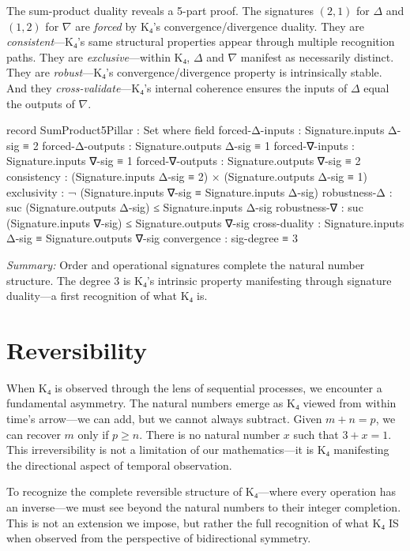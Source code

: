 \documentclass[11pt,a4paper]{book}
\begin{document}
The sum-product duality reveals a 5-part proof. The signatures $(2,1)$ for $\Delta$ and 
$(1,2)$ for $\nabla$ are \emph{forced} by K₄'s convergence/divergence duality. They are 
\emph{consistent}—K₄'s same structural properties appear through multiple recognition paths. 
They are \emph{exclusive}—within K₄, $\Delta$ and $\nabla$ manifest as necessarily distinct. 
They are \emph{robust}—K₄'s convergence/divergence property is intrinsically stable. And 
they \emph{cross-validate}—K₄'s internal coherence ensures the inputs of $\Delta$ equal 
the outputs of $\nabla$.

\begin{code}
record SumProduct5Pillar : Set where
  field
    forced-Δ-inputs  : Signature.inputs Δ-sig ≡ 2
    forced-Δ-outputs : Signature.outputs Δ-sig ≡ 1
    forced-∇-inputs  : Signature.inputs ∇-sig ≡ 1
    forced-∇-outputs : Signature.outputs ∇-sig ≡ 2
    consistency      : (Signature.inputs Δ-sig ≡ 2) × (Signature.outputs Δ-sig ≡ 1)
    exclusivity      : ¬ (Signature.inputs ∇-sig ≡ Signature.inputs Δ-sig)
    robustness-Δ     : suc (Signature.outputs Δ-sig) ≤ Signature.inputs Δ-sig
    robustness-∇     : suc (Signature.inputs ∇-sig) ≤ Signature.outputs ∇-sig
    cross-duality    : Signature.inputs Δ-sig ≡ Signature.outputs ∇-sig
    convergence      : sig-degree ≡ 3
\end{code}

\medskip
\noindent\textit{Summary:} Order and operational signatures complete the natural number 
structure. The degree 3 is K₄'s intrinsic property manifesting through signature 
duality—a first recognition of what K₄ is.

\chapter{Reversibility}

When K₄ is observed through the lens of sequential processes, we encounter a fundamental asymmetry. The natural numbers emerge as K₄ viewed from within time's arrow—we can add, but we cannot always subtract. Given $m + n = p$, we can recover $m$ only if $p \ge n$. There is no natural number $x$ such that $3 + x = 1$. This irreversibility is not a limitation of our mathematics—it is K₄ manifesting the directional aspect of temporal observation.

To recognize the complete reversible structure of K₄—where every operation has an inverse—we must see beyond the natural numbers to their integer completion. This is not an extension we impose, but rather the full recognition of what K₄ IS when observed from the perspective of bidirectional symmetry.
\end{document}
